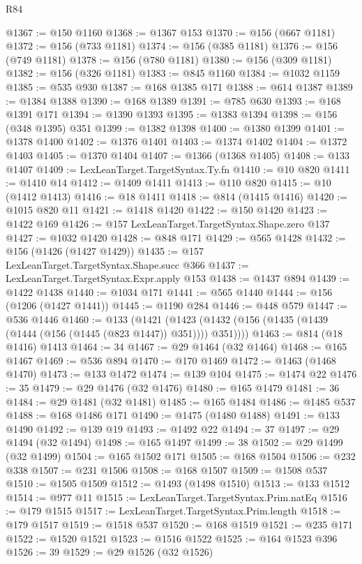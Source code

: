 \begin{lexlean}{R84}
\begin{coremodule}
@1367 := @150 @1160
@1368 := @1367 @153
@1370 := @156 (@667 @1181)
@1372 := @156 (@733 @1181)
@1374 := @156 (@385 @1181)
@1376 := @156 (@749 @1181)
@1378 := @156 (@780 @1181)
@1380 := @156 (@309 @1181)
@1382 := @156 (@326 @1181)
@1383 := @845 @1160
@1384 := @1032 @1159
@1385 := @535 @930
@1387 := @168 @1385 @171
@1388 := @614 @1387
@1389 := @1384 @1388
@1390 := @168 @1389
@1391 := @785 @630
@1393 := @168 @1391 @171
@1394 := @1390 @1393
@1395 := @1383 @1394
@1398 := @156 (@348 @1395) @351
@1399 := @1382 @1398
@1400 := @1380 @1399
@1401 := @1378 @1400
@1402 := @1376 @1401
@1403 := @1374 @1402
@1404 := @1372 @1403
@1405 := @1370 @1404
@1407 := @1366 (@1368 @1405)
@1408 := @133 @1407
@1409 := LexLeanTarget.TargetSyntax.Ty.fn
@1410 := @10 @820
@1411 := @1410 @14
@1412 := @1409 @1411
@1413 := @110 @820
@1415 := @10 (@1412 @1413)
@1416 := @18 @1411
@1418 := @814 (@1415 @1416)
@1420 := @1015 @820 @11
@1421 := @1418 @1420
@1422 := @150 @1420
@1423 := @1422 @169
@1426 := @157 LexLeanTarget.TargetSyntax.Shape.zero @137
@1427 := @1032 @1420
@1428 := @848 @171
@1429 := @565 @1428
@1432 := @156 (@1426 (@1427 @1429))
@1435 := @157 LexLeanTarget.TargetSyntax.Shape.succ @366
@1437 := LexLeanTarget.TargetSyntax.Expr.apply @153
@1438 := @1437 @894
@1439 := @1422 @1438
@1440 := @1034 @171
@1441 := @565 @1440
@1444 := @156 (@1206 (@1427 @1441))
@1445 := @1190 @284
@1446 := @448 @579
@1447 := @536 @1446
@1460 := @133
    (@1421 (@1423 (@1432 (@156 (@1435 (@1439 (@1444 (@156 (@1445 (@823 @1447)) @351)))) @351))))
@1463 := @814 (@18 @1416) @1413
@1464 := 34
@1467 := @29 @1464 (@32 @1464)
@1468 := @165 @1467
@1469 := @536 @894
@1470 := @170 @1469
@1472 := @1463 (@1468 @1470)
@1473 := @133 @1472
@1474 := @139 @104
@1475 := @1474 @22
@1476 := 35
@1479 := @29 @1476 (@32 @1476)
@1480 := @165 @1479
@1481 := 36
@1484 := @29 @1481 (@32 @1481)
@1485 := @165 @1484
@1486 := @1485 @537
@1488 := @168 @1486 @171
@1490 := @1475 (@1480 @1488)
@1491 := @133 @1490
@1492 := @139 @19
@1493 := @1492 @22
@1494 := 37
@1497 := @29 @1494 (@32 @1494)
@1498 := @165 @1497
@1499 := 38
@1502 := @29 @1499 (@32 @1499)
@1504 := @165 @1502 @171
@1505 := @168 @1504
@1506 := @232 @338
@1507 := @231 @1506
@1508 := @168 @1507
@1509 := @1508 @537
@1510 := @1505 @1509
@1512 := @1493 (@1498 @1510)
@1513 := @133 @1512
@1514 := @977 @11
@1515 := LexLeanTarget.TargetSyntax.Prim.natEq
@1516 := @179 @1515
@1517 := LexLeanTarget.TargetSyntax.Prim.length
@1518 := @179 @1517
@1519 := @1518 @537
@1520 := @168 @1519
@1521 := @235 @171
@1522 := @1520 @1521
@1523 := @1516 @1522
@1525 := @164 @1523 @396
@1526 := 39
@1529 := @29 @1526 (@32 @1526)

\end{coremodule}
\end{lexlean}
